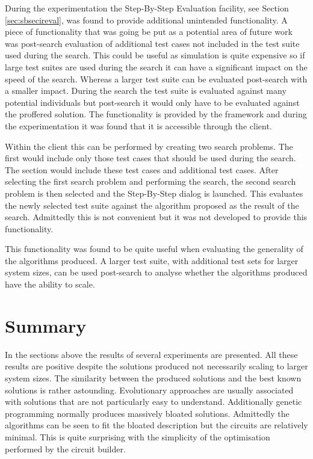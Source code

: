 During the experimentation the Step-By-Step Evaluation facility, see Section \ref{sec:sbsecireval}, was found to provide additional unintended functionality.
A piece of functionality that was going be put as a potential area of future work was post-search evaluation of additional test cases not included in the test suite used during the search.
This could be useful as simulation is quite expensive so if large test suites are used during the search it can have a significant impact on the speed of the search.
Whereas a larger test suite can be evaluated post-search with a smaller impact.
During the search the test suite is evaluated against many potential individuals but post-search it would only have to be evaluated against the proffered solution.
The functionality is provided by the framework and during the experimentation it was found that it is accessible through the client.

Within the client this can be performed by creating two search problems.
The first would include only those test cases that should be used during the search.
The section would include these test cases and additional test cases.
After selecting the first search problem and performing the search, the second search problem is then selected and the Step-By-Step dialog is launched.
This evaluates the newly selected test suite against the algorithm proposed as the result of the search.
Admittedly this is not convenient but it was not developed to provide this functionality.

This functionality was found to be quite useful when evaluating the generality of the algorithms produced.
A larger test suite, with additional test sets for larger system sizes, can be used post-search to analyse whether the algorithms produced have the ability to scale.

\section{Summary}

In the sections above the results of several experiments are presented.
All these results are positive despite the solutions produced not necessarily scaling to larger system sizes.
The similarity between the produced solutions and the best known solutions is rather astounding.
Evolutionary approaches are usually associated with solutions that are not particularly easy to understand.
Additionally genetic programming normally produces massively bloated solutions.
Admittedly the algorithms can be seen to fit the bloated description but the circuits are relatively minimal.
This is quite surprising with the simplicity of the optimisation performed by the circuit builder.

